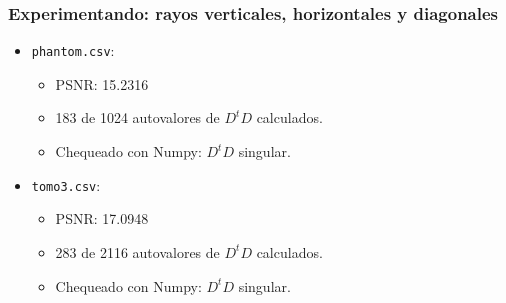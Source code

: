 \documentclass{beamer}
\begin{document}
\begin{frame}
\frametitle{Experimentando: rayos verticales, horizontales y diagonales}

\begin{itemize}
\item \texttt{phantom.csv}:
\begin{itemize}
\item PSNR: 15.2316
\item 183 de 1024 autovalores de $D^tD$ calculados.
\item Chequeado con Numpy: $D^tD$ singular.%
\end{itemize}
\item \texttt{tomo3.csv}:
\begin{itemize}
\item PSNR: 17.0948
\item 283 de 2116 autovalores de $D^tD$ calculados.
\item Chequeado con Numpy: $D^tD$ singular.%
\end{itemize}
\end{itemize}

\end{frame}
\end{document}

